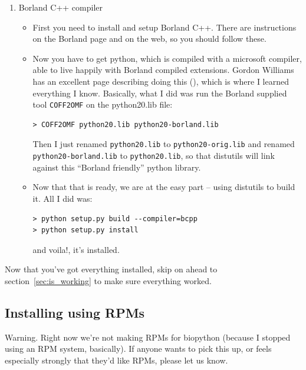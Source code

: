 \documentclass{report}
\begin{document}
\begin{enumerate}
  \item Borland C++ compiler

\begin{itemize}
  \item First you need to install and setup Borland C++. There are instructions on the Borland page and on the web, so you should follow these.
 
  \item Now you have to get python, which is compiled with a microsoft compiler, able to live happily with Borland compiled extensions. Gordon Williams has an excellent page describing doing this (), which is where I learned everything I know. Basically, what I did was run the Borland supplied tool \verb|COFF2OMF| on the python20.lib file:

\begin{verbatim}
> COFF2OMF python20.lib python20-borland.lib
\end{verbatim}

Then I just renamed \verb|python20.lib| to \verb|python20-orig.lib| and renamed \verb|python20-borland.lib| to \verb|python20.lib|, so that distutils will link against this ``Borland friendly'' python library.

  \item Now that that is ready, we are at the easy part -- using distutils to build it. All I did was:

\begin{verbatim}
> python setup.py build --compiler=bcpp
> python setup.py install
\end{verbatim}

and voila!, it's installed. 

\end{itemize}

\end{enumerate}

Now that you've got everything installed, skip on ahead to section~\ref{sec:is_working} to make sure everything worked.

\subsection{Installing using RPMs}

Warning. Right now we're not making RPMs for biopython (because I
stopped using an RPM system, basically). If anyone wants to pick this
up, or feels especially strongly that they'd like RPMs, please let us
know.
\end{document}
